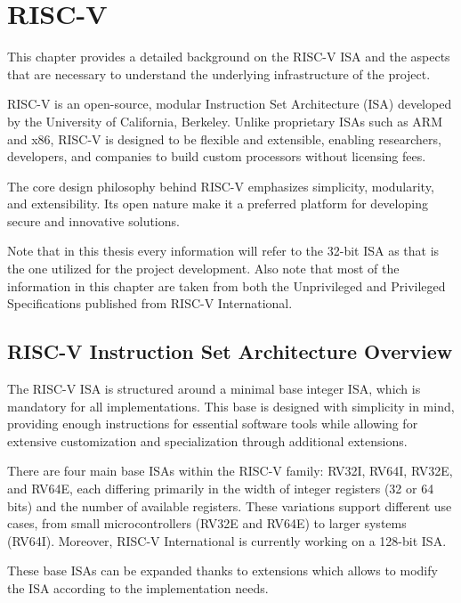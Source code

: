 \chapter{RISC-V}
\label{cha:riscv}

This chapter provides a detailed background on the RISC-V ISA and the aspects
that are necessary to understand the underlying infrastructure of the project.

RISC-V is an open-source, modular Instruction Set Architecture (ISA) developed by
the University of California, Berkeley\cite{riscv}. Unlike proprietary ISAs such
as ARM and x86, RISC-V is designed to be flexible and extensible, enabling
researchers, developers, and companies to build custom processors without
licensing fees.

The core design philosophy behind RISC-V emphasizes simplicity, modularity, and
extensibility. Its open nature make it a preferred platform for developing secure
and innovative solutions.

Note that in this thesis every information will refer to the 32-bit ISA as that is
the one utilized for the project development. Also note that most of the
information in this chapter are taken from both the Unprivileged and Privileged
Specifications\cite{specifications} published from RISC-V International.

\section{RISC-V Instruction Set Architecture Overview}
\label{sec:riscv_isa}

The RISC-V ISA is structured around a minimal base integer ISA, which is mandatory
for all implementations. This base is designed with simplicity in mind, providing
enough instructions for essential software tools while allowing for extensive customization
and specialization through additional extensions.

There are four main base ISAs within the RISC-V family: RV32I, RV64I, RV32E, and
RV64E, each differing primarily in the width of integer registers (32 or 64 bits)
and the number of available registers. These variations support different use cases,
from small microcontrollers (RV32E and RV64E) to larger systems (RV64I). Moreover,
RISC-V International is currently working on a 128-bit ISA.

These base ISAs can be expanded thanks to extensions which allows to modify the
ISA according to the implementation needs.

